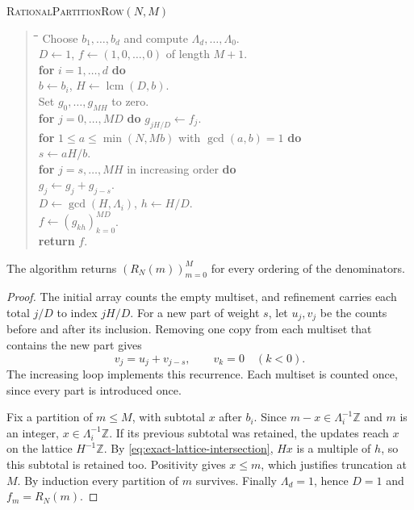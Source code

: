 \smallskip
\noindent\begin{minipage}{\linewidth}
\textsc{RationalPartitionRow}\((N,M)\)
\begin{quote}
\small
\begin{tabbing}
\hspace{1.2em}\=\hspace{1.2em}\=\hspace{1.2em}\=\kill
Choose \(b_1,\ldots,b_d\) and compute \(\Lambda_d,\ldots,\Lambda_0\).\\
\(D\gets1\), \quad \(f\gets(1,0,\ldots,0)\) of length \(M+1\).\\
\textbf{for} \(i=1,\ldots,d\) \textbf{do}\\
\> \(b\gets b_i\), \quad \(H\gets\operatorname{lcm}(D,b)\).\\
\> Set \(g_0,\ldots,g_{MH}\) to zero.\\
\> \textbf{for} \(j=0,\ldots,MD\) \textbf{do} \(g_{jH/D}\gets f_j\).\\
\> \textbf{for} \(1\le a\le\min(N,Mb)\) with \(\gcd(a,b)=1\) \textbf{do}\\
\>\> \(s\gets aH/b\).\\
\>\> \textbf{for} \(j=s,\ldots,MH\) in increasing order \textbf{do}\\
\>\>\> \(g_j\gets g_j+g_{j-s}\).\\
\> \(D\gets\gcd(H,\Lambda_i)\), \quad \(h\gets H/D\).\\
\> \(f\gets(g_{kh})_{k=0}^{MD}\).\\
\textbf{return} \(f\).
\end{tabbing}
\end{quote}
\end{minipage}

\begin{proposition}\label{prop:exact-projection}
The algorithm returns \((R_N(m))_{m=0}^{M}\) for every ordering of the
denominators.
\end{proposition}
\begin{proof}
The initial array counts the empty multiset, and refinement carries
each total \(j/D\) to index \(jH/D\). For a new part of weight \(s\),
let \(u_j,v_j\) be the counts before and after its inclusion. Removing
one copy from each multiset that contains the new part gives
\[
  v_j=u_j+v_{j-s},\qquad v_k=0\quad(k<0).
\]
The increasing loop implements this recurrence. Each multiset is
counted once, since every part is introduced once.

Fix a partition of \(m\le M\), with subtotal \(x\) after \(b_i\).
Since \(m-x\in\Lambda_i^{-1}\mathbb Z\) and \(m\) is an integer,
\(x\in\Lambda_i^{-1}\mathbb Z\). If its previous subtotal was retained,
the updates reach \(x\) on the lattice \(H^{-1}\mathbb Z\).
By \eqref{eq:exact-lattice-intersection}, \(Hx\) is a multiple of
\(h\), so this subtotal is retained too. Positivity gives \(x\le m\),
which justifies truncation at \(M\). By induction every partition of
\(m\) survives. Finally \(\Lambda_d=1\), hence \(D=1\) and \(f_m=R_N(m)\).
\end{proof}

